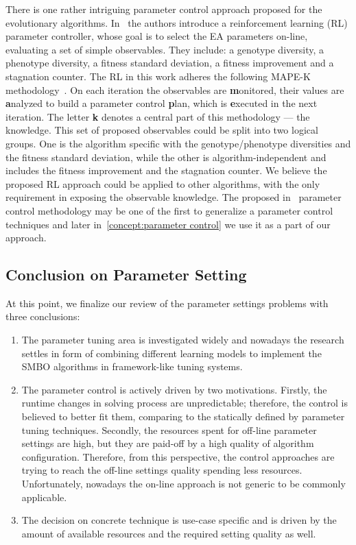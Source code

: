 There is one rather intriguing parameter control approach proposed for the evolutionary algorithms. In~\cite{karafotias2014generic} the authors introduce a reinforcement learning (RL) parameter controller, whose goal is to select the EA parameters on-line, evaluating a set of simple observables. They include: a genotype diversity, a phenotype diversity, a fitness standard deviation, a fitness improvement and a stagnation counter.
The RL in this work adheres the following MAPE-K methodology~\cite{brun2009engineering}. On each iteration the observables are \textbf{m}onitored, their values are \textbf{a}nalyzed to build a parameter control \textbf{p}lan, which is \textbf{e}xecuted in the next iteration. The letter \textbf{k} denotes a central part of this methodology — the knowledge.
This set of proposed observables could be split into two logical groups. One is the algorithm specific with the genotype/phenotype diversities and the fitness standard deviation, while the other is algorithm-independent and includes the fitness improvement and the stagnation counter. We believe the proposed RL approach could be applied to other algorithms, with the only requirement in exposing the observable knowledge. The proposed in~\cite{karafotias2014generic} parameter control methodology may be one of the first to generalize a parameter control techniques and later in~\cref{concept:parameter control} we use it as a part of our approach.


\subsection{Conclusion on Parameter Setting}\label{bg: parameter setting conclution}
At this point, we finalize our review of the parameter settings problems with three conclusions:
\begin{enumerate}
	\item The parameter tuning area is investigated widely and nowadays the research settles in form of combining different learning models to implement the SMBO algorithms in framework-like tuning systems.
	
	\item The parameter control is actively driven by two motivations. Firstly, the runtime changes in solving process are unpredictable; therefore, the control is believed to better fit them, comparing to the statically defined by parameter tuning techniques. Secondly, the resources spent for off-line parameter settings are high, but they are paid-off by a high quality of algorithm configuration. Therefore, from this perspective, the control approaches are trying to reach the off-line settings quality spending less resources. Unfortunately, nowadays the on-line approach is not generic to be commonly applicable.
	
	\item The decision on concrete technique is use-case specific and is driven by the amount of available resources and the required setting quality as well.
\end{enumerate}


